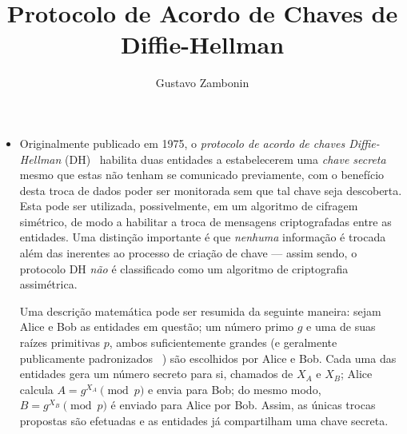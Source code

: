 \documentclass{../sftex/sftex}
\title{Protocolo de Acordo de Chaves de Diffie-Hellman}
\author{Gustavo Zambonin}
\begin{document}
\maketitle

\begin{itemize}

\item Originalmente publicado em 1975, o \emph{protocolo de acordo de chaves
Diffie-Hellman} (DH)~\cite{Diffie:2006:NDC:2263321.2269104} habilita duas
entidades a estabelecerem uma \emph{chave secreta} mesmo que estas não tenham se
comunicado previamente, com o benefício desta troca de dados poder ser
monitorada sem que tal chave seja descoberta. Esta pode ser utilizada,
possivelmente, em um algoritmo de cifragem simétrico, de modo a habilitar a
troca de mensagens criptografadas entre as entidades. Uma distinção importante é
que \emph{nenhuma} informação é trocada além das inerentes ao processo de
criação de chave --- assim sendo, o protocolo DH \emph{não} é classificado como
um algoritmo de criptografia assimétrica.

Uma descrição matemática pode ser resumida da seguinte maneira: sejam Alice e
Bob as entidades em questão; um número primo $g$ e uma de suas raízes primitivas
$p$, ambos suficientemente grandes (e geralmente publicamente padronizados
~\cite{rfc5114}) são escolhidos por Alice e Bob. Cada uma das entidades gera
um número secreto para si, chamados de $X_A$ e $X_B$; Alice calcula $A = g^{X_A}
\pmod{p}$ e envia para Bob; do mesmo modo, $B = g^{X_B} \pmod{p}$ é enviado para
Alice por Bob. Assim, as únicas trocas propostas são efetuadas e as entidades já
compartilham uma chave secreta.


\end{itemize}
\end{document}
